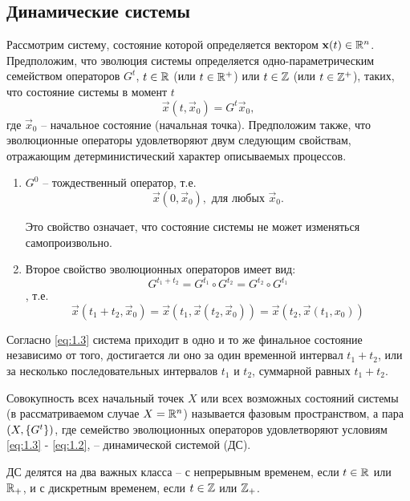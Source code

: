\subsection{Динамические системы} %
Рассмотрим систему, состояние которой определяется вектором $\mathbf x (t) 
\in \mathbb{R}^n$. Предположим, что эволюция системы определяется одно-параметрическим семейством операторов $G^t$, $t\in\mathbb{R}$ (или $t\in\mathbb{R}^+$) или $t\in \mathbb{Z}$ (или $t\in\mathbb{Z}^+$), таких, что состояние системы в момент $t$
\begin{equation}
	\label{eq:1.1}
	\vec x(t,\vec x_0) = G^t \vec x_0,
\end{equation}
где $\vec x_0$ -- начальное состояние (начальная точка). Предположим также, что эволюционные операторы удовлетворяют двум следующим свойствам, отражающим детерминистический характер описываемых процессов.
\begin{enumerate}
	\item $G^0$ -- тождественный оператор, т.е.
	\begin{equation}
	\label{eq:1.2}
		\vec x(0, \vec x_0), \text{ для любых } \vec x_0.
	\end{equation}

Это свойство означает, что состояние системы не может изменяться самопроизвольно.

	\item  Второе свойство эволюционных операторов имеет вид:
	\begin{equation}
		\label{eq:1.3}
		G^{t_1+t_2}= G^{t_1} \circ G^{t_2}= G^{t_2} \circ G^{t_1}
	\end{equation},
	т.е.
	\begin{equation}
		\label{eq:1.4}
		\vec x (t_1+t_2, \vec x_0) = \vec x (t_1, \vec x(t_2, \vec x_0)) = \vec x (t_2, \vec x (t_1,x_0))
	\end{equation}
\end{enumerate}
 
 Согласно \eqref{eq:1.3} система приходит в одно и то же финальное состояние независимо от того, достигается ли оно за один временной интервал $t_1+t_2$, или за несколько последовательных интервалов $t_1$ и $t_2$, суммарной равных $t_1+t_2$.

 Совокупность всех начальный точек $X$ или всех возможных состояний системы (в рассматриваемом случае $X= \mathbb{R}^n$) называется фазовым пространством, а пара $\qty(X,\{G^t\})$, где семейство эволюционных операторов удовлетворяют условиям \eqref{eq:1.3} - \eqref{eq:1.2}, -- динамической системой (ДС).

 ДС делятся на два важных класса -- с непрерывным временем, если $t\in \mathbb{R}$ или $\mathbb{R}_+$,  и с дискретным временем, если $t\in \mathbb{Z}$ или $\mathbb{Z}_+$.

